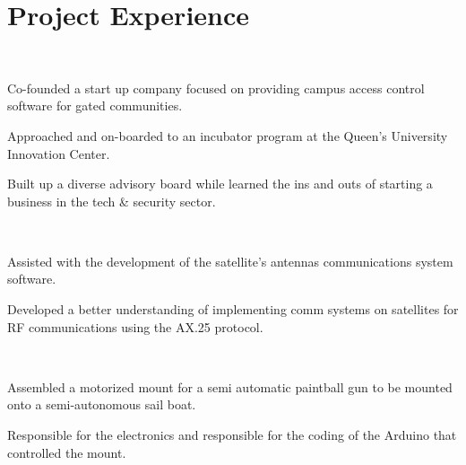 \documentclass[]{hieudo-build}
\begin{document}
\hfill
\begin{minipage}[t]{0.69\textwidth} 

\section{Project Experience}

 \\
\vspace{\topsep} %
\begin{tightemize}
\item Co-founded a start up company focused on providing campus access control software for gated communities.
\item Approached and on-boarded to an incubator program at the Queen's University Innovation Center.
\item Built up a diverse advisory board while learned the ins and outs of starting a business in the tech \& security sector.
\end{tightemize}
\sectionsep

\\
\begin{tightemize}
\item Assisted with the development of the satellite's antennas communications system software.
\item Developed a better understanding of implementing comm systems on satellites for RF communications using the AX.25 protocol.
\end{tightemize}
\sectionsep

 \\
\begin{tightemize}
\item Assembled a motorized mount for a semi automatic paintball gun to be mounted onto a semi-autonomous sail boat.
\item Responsible for the electronics and responsible for the coding of the Arduino that controlled the mount.
\end{tightemize}
\sectionsep


\end{minipage}
\end{document}

